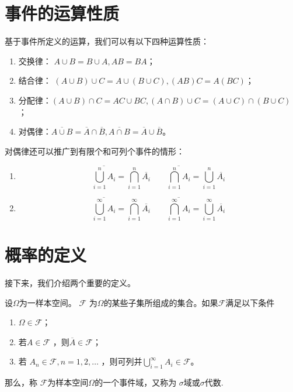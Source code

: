 \section{事件的运算性质}
基于事件所定义的运算，我们可以有以下四种运算性质：
\begin{enumerate}
  \item 交换律： $A\cup B =B \cup A, AB =BA$；
  \item 结合律： $\left (  A\cup B \right )\cup C  =A\cup \left ( B \cup C \right ),\left (  A B \right ) C  =A \left ( B  C \right ) $；
  \item 分配律：$(A\cup B)\cap C=AC\cup BC, (A\cap B)\cup C=(A\cup C)\cap (B\cup C)$；
  \item 对偶律：$\overline{A \cup B } =\overline{A} \cap \overline{B},\overline{A \cap  B } =\overline{A} \cup  \overline{B}$。
\end{enumerate}
对偶律还可以推广到有限个和可列个事件的情形：
      \begin{enumerate}
      \item $$\overline{\bigcup_{i=1}^{n} A_{i} } =\bigcap_{i=1}^{n} \overline{A_{i} } \quad \quad 
      \overline{\bigcap_{i=1}^{n} A_{i} } =\bigcup_{i=1}^{n} \overline{A_{i} } 
      $$
      \item $$ \overline{\bigcup_{i=1}^{\infty } A_{i} } =\bigcap_{i=1}^{\infty } \overline{A_{i} }  \quad \quad
 \overline{\bigcap_{i=1}^{\infty } A_{i} } =\bigcup_{i=1}^{\infty } \overline{A_{i} }
$$
\end{enumerate}

\section{概率的定义}
接下来，我们介绍两个重要的定义。
\begin{definition}[事件域] \label{def:sigma field} 
设$\Omega$为一样本空间。 $\mathcal{F}$ 为$\Omega$的某些子集所组成的集合。如果$\mathcal{F}$满足以下条件
\begin{enumerate}
    \item $\Omega \in \mathcal{F} $；
    \item 若$A \in \mathcal{F} $ ，则$ \overline{A} \in \mathcal{F} $；
    \item 若 $A_{n} \in \mathcal{F} ,n=1,2,\dots $ ，则可列并$\bigcup_{i=1}^{\infty } A_{i} \in \mathcal{F}$。
\end{enumerate}
那么，称 $\mathcal{F}$为样本空间$\Omega$的一个事件域，又称为 $\sigma$域或$\sigma$代数.
\end{definition}

